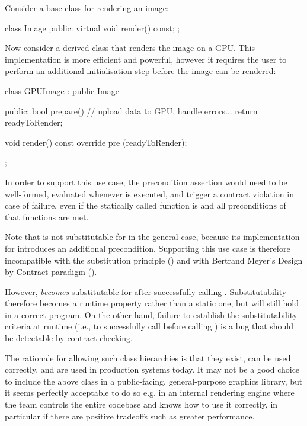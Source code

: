 Consider a base class for rendering an image:

\begin{codeblock}
class Image {
public:
  virtual void render() const;
};
\end{codeblock}

Now consider a derived class that renders the image on a GPU. This implementation is more efficient and powerful, however it requires the user to perform an additional initialisation step before the image can be rendered:

\begin{codeblock}
class GPUImage : public Image {
public:
  bool prepare() { 
    // upload data to GPU, handle errors...
    return readyToRender;
  }
  
  void render() const override
    pre (readyToRender);
};
\end{codeblock}

In order to support this use case, the precondition assertion  would need to be well-formed, evaluated whenever  is executed, and trigger a contract violation in case of failure, even if the statically called function is  and all preconditions of that functions are met.

Note that  is not substitutable for  in the general case, because its implementation for  introduces an additional precondition. Supporting this use case is therefore incompatible with the substitution principle () and with Bertrand Meyer's Design by Contract paradigm ().

However,  \emph{becomes} substitutable for  after successfully calling . Substitutability therefore becomes a runtime property rather than a static one, but will still hold in a correct program. On the other hand, failure to establish the substitutability criteria at runtime (i.e., to successfully call  before calling ) is a bug that should be detectable by contract checking.

The rationale for allowing such class hierarchies is that they exist, can be used correctly, and are used in production systems today. It may not be a good choice to include the above  class in a public-facing, general-purpose graphics library, but it seems perfectly acceptable to do so e.g. in an internal rendering engine where the team controls the entire codebase and knows how to use it correctly, in particular if there are positive tradeoffs such as greater performance. 

